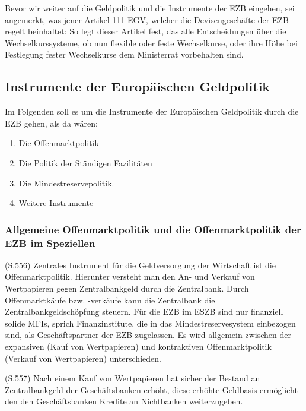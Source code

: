 \documentclass[
        onecolumn,
        a4paper,
        abstracton,
        parskip=half
        ,final
        ]{scrartcl}
\begin{document}
Bevor wir weiter auf die Geldpolitik und die Instrumente der EZB eingehen, sei angemerkt, was jener Artikel 111 EGV, welcher die Devisengesch{\"a}fte der EZB regelt beinhaltet:
So legt dieser Artikel fest, das alle Entscheidungen {\"u}ber die Wechselkurssysteme, ob nun flexible oder feste Wechselkurse, oder ihre H{\"o}he bei Festlegung fester Wechselkurse dem Ministerrat vorbehalten sind. \citep[vgl.][S.555]{Basseler2010}




\subsection{Instrumente der Europ{\"a}ischen Geldpolitik}

Im Folgenden soll es um die Instrumente der Europ{\"a}ischen Geldpolitik durch die EZB gehen, als da w{\"a}ren:
\begin{enumerate}
  \item{Die Offenmarktpolitik}
  \item{Die Politik der St{\"a}ndigen Fazilit{\"a}ten}
  \item{Die Mindestreservepolitik.}
  \item{Weitere Instrumente}
\end{enumerate}




\subsubsection{Allgemeine Offenmarktpolitik und die Offenmarktpolitik der EZB im Speziellen}

(S.556)
Zentrales Instrument f{\"u}r die Geldversorgung der Wirtschaft ist die Offenmarktpolitik. Hierunter versteht man den An- und Verkauf von Wertpapieren gegen Zentralbankgeld durch die Zentralbank.
Durch Offenmarktk{\"a}ufe bzw. -verk{\"a}ufe kann die Zentralbank die Zentralbankgeldsch{\"o}pfung steuern. F{\"u}r die EZB im ESZB sind nur finanziell solide MFIs, sprich Finanzinstitute, die in das Mindestreservesystem einbezogen sind, als Gesch{\"a}ftspartner der EZB zugelassen.
Es wird allgemein zwischen der expansiven (Kauf von Wertpapieren) und kontraktiven Offenmarktpolitik (Verkauf von Wertpapieren) unterschieden.

(S.557)
Nach einem Kauf von Wertpapieren hat sicher der Bestand an Zentralbankgeld der Gesch{\"a}ftsbanken erh{\"o}ht, diese erh{\"o}hte Geldbasis erm{\"o}glicht den den Gesch{\"a}ftsbanken Kredite an Nichtbanken weiterzugeben.
\end{document}
